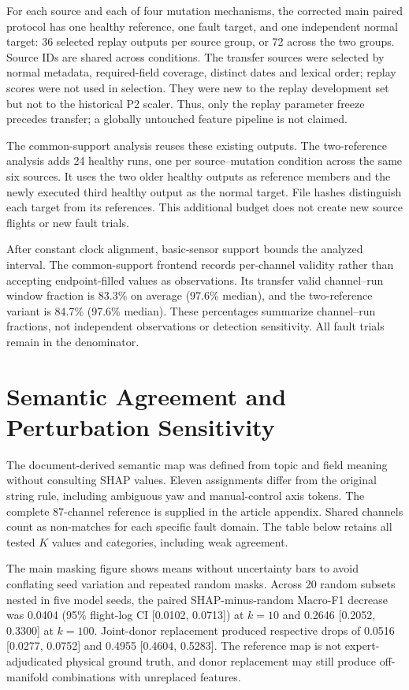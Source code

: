 \documentclass[10pt,a4paper]{article}
\begin{document}
For each source and each of four mutation mechanisms, the corrected main paired protocol has one healthy reference, one fault target, and one independent normal target: 36 selected replay outputs per source group, or 72 across the two groups. Source IDs are shared across conditions. The transfer sources were selected by normal metadata, required-field coverage, distinct dates and lexical order; replay scores were not used in selection. They were new to the replay development set but not to the historical P2 scaler. Thus, only the replay parameter freeze precedes transfer; a globally untouched feature pipeline is not claimed.

The common-support analysis reuses these existing outputs. The two-reference analysis adds 24 healthy runs, one per source--mutation condition across the same six sources. It uses the two older healthy outputs as reference members and the newly executed third healthy output as the normal target. File hashes distinguish each target from its references. This additional budget does not create new source flights or new fault trials.

After constant clock alignment, basic-sensor support bounds the analyzed interval. The common-support frontend records per-channel validity rather than accepting endpoint-filled values as observations. Its transfer valid channel--run window fraction is 83.3\% on average (97.6\% median), and the two-reference variant is 84.7\% (97.6\% median). These percentages summarize channel--run fractions, not independent observations or detection sensitivity. All fault trials remain in the denominator.
\FloatBarrier

\section{Semantic Agreement and Perturbation Sensitivity}

The document-derived semantic map was defined from topic and field meaning without consulting SHAP values. Eleven assignments differ from the original string rule, including ambiguous yaw and manual-control axis tokens. The complete 87-channel reference is supplied in the article appendix. Shared channels count as non-matches for each specific fault domain. The table below retains all tested $K$ values and categories, including weak agreement.


The main masking figure shows means without uncertainty bars to avoid conflating seed variation and repeated random masks. Across 20 random subsets nested in five model seeds, the paired SHAP-minus-random Macro-F1 decrease was 0.0404 (95\% flight-log CI [0.0102, 0.0713]) at $k=10$ and 0.2646 [0.2052, 0.3300] at $k=100$. Joint-donor replacement produced respective drops of 0.0516 [0.0277, 0.0752] and 0.4955 [0.4604, 0.5283]. The reference map is not expert-adjudicated physical ground truth, and donor replacement may still produce off-manifold combinations with unreplaced features.
\FloatBarrier
\end{document}

